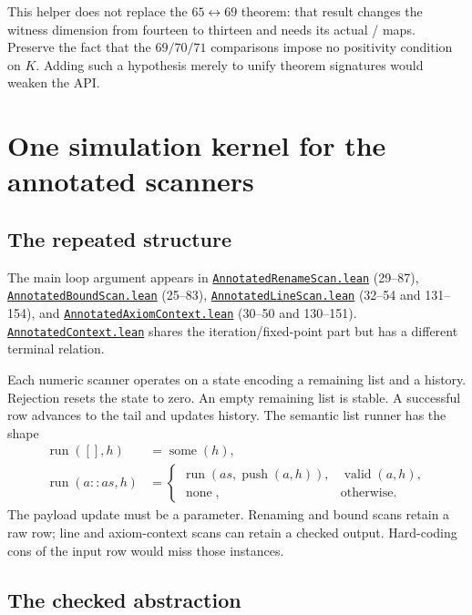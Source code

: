 \documentclass[11pt,letterpaper]{article}
\newcommand{\code}[1]{\texttt{\detokenize{#1}}}
\newcommand{\SourceBase}{https://github.com/VladimirReshetnikov/ProveIt/blob/60e9c5d620c6c387d932876cfa2d9376f64ea56c/Computability/DiophantineConsistency}
\newcommand{\module}[1]{\href{\SourceBase/Lean/DiophantineConsistency/#1.lean}{\texttt{#1.lean}}}
\begin{document}
This helper does not replace the $65\leftrightarrow69$ theorem: that result changes the witness dimension from fourteen to thirteen and needs its actual \code{completes}/\code{restores} maps. Preserve the fact that the $69/70/71$ comparisons impose no positivity condition on $K$. Adding such a hypothesis merely to unify theorem signatures would weaken the API.

\section{One simulation kernel for the annotated scanners}

\subsection{The repeated structure}

The main loop argument appears in \module{AnnotatedRenameScan} (29--87), \module{AnnotatedBoundScan} (25--83), \module{AnnotatedLineScan} (32--54 and 131--154), and \module{AnnotatedAxiomContext} (30--50 and 130--151). \module{AnnotatedContext} shares the iteration/fixed-point part but has a different terminal relation.

Each numeric scanner operates on a state encoding a remaining list and a history. Rejection resets the state to zero. An empty remaining list is stable. A successful row advances to the tail and updates history. The semantic list runner has the shape
\[
\begin{aligned}
\operatorname{run}([],h)&=\operatorname{some}(h),\\
\operatorname{run}(a::as,h)&=
 \begin{cases}
 \operatorname{run}(as,\operatorname{push}(a,h)),&\operatorname{valid}(a,h),\\
 \operatorname{none},&\text{otherwise}.
 \end{cases}
\end{aligned}
\]
The payload update must be a parameter. Renaming and bound scans retain a raw row; line and axiom-context scans can retain a checked output. Hard-coding cons of the input row would miss those instances.

\subsection{The checked abstraction}
\end{document}
